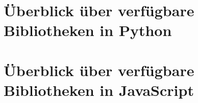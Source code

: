 \section{Überblick über verfügbare Bibliotheken in Python}\label{sec:labeling-platform-ueberblick-python}

\section{Überblick über verfügbare Bibliotheken in JavaScript}\label{sec:labeling-platform-ueberblick-js}

